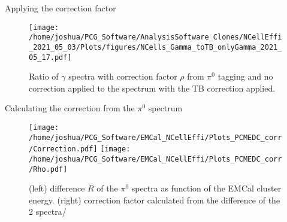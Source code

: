 \documentclass[ALICE]{ALICE_analysis_notes}
\newcommand{\PZ}{$\pi^0$\xspace}
\begin{document}
\begin{section}{Applying the correction factor}
	\begin{figure}[t]
		\centering
		\texttt{[image: /home/joshua/PCG\_Software/AnalysisSoftware\_Clones/NCellEffi\_2021\_05\_03/Plots/figures/NCells\_Gamma\_toTB\_onlyGamma\_2021\_05\_17.pdf]}
		\caption{ Ratio of $\gamma$ spectra with correction factor $\rho$ from \PZ tagging and no correction applied to the spectrum with the TB correction applied.}
		\label{fig:NCells_GammaSpec}
	\end{figure}

	
\end{section}


\newpage

\begin{section}{Calculating the correction from the \PZ spectrum}
	\begin{figure}[ht!]
		\centering
		\texttt{[image: /home/joshua/PCG\_Software/EMCal\_NCellEffi/Plots\_PCMEDC\_corr/Correction.pdf]}
		\texttt{[image: /home/joshua/PCG\_Software/EMCal\_NCellEffi/Plots\_PCMEDC\_corr/Rho.pdf]}
		\caption{ (left) difference $R$ of the \PZ spectra as function of the EMCal cluster energy. (right) correction factor calculated from the difference of the 2 spectra/}
		\label{fig:NCellEff_from spectrum}
		
	\end{figure}
	

\end{section}
\end{document}
